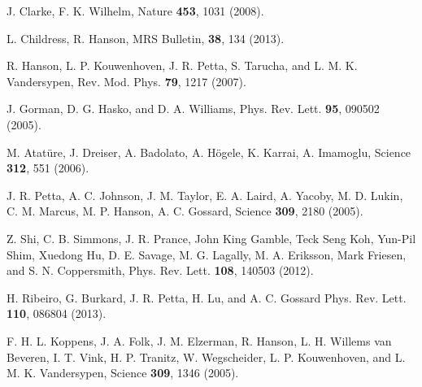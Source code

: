 \documentclass[prb,twocolumn,showpacs,floats]{revtex4}
\begin{document}
\begin{thebibliography}{99}


 J. Clarke, F. K. Wilhelm, Nature {\bf 453}, 1031 (2008).

 L. Childress, R.  Hanson,  MRS Bulletin, {\bf 38}, 134 (2013). 

R. Hanson, L. P.  Kouwenhoven, J. R.  Petta, S. Tarucha,  and L. M. K. Vandersypen,
Rev. Mod. Phys. {\bf 79}, 1217 (2007).

 J. Gorman, D. G. Hasko, and D. A. Williams, Phys. Rev. Lett. {\bf 95}, 090502 (2005).

 M. Atat\"ure, J. Dreiser, A. Badolato, A. H\"ogele, K. Karrai, A. Imamoglu,
Science {\bf 312}, 551 (2006).

 J. R. Petta, A. C. Johnson, J. M. Taylor, E. A. Laird, A. Yacoby, M. D. Lukin, C. M. Marcus, 
M. P. Hanson, A. C. Gossard, Science {\bf 309}, 2180 (2005).

   Z. Shi, C. B. Simmons, J. R. Prance, John King Gamble, Teck Seng Koh, Yun-Pil Shim,
Xuedong Hu, D. E. Savage, M. G. Lagally, M. A. Eriksson, Mark Friesen, and S. N. Coppersmith,
 Phys. Rev. Lett.  {\bf 108}, 140503 (2012).

 H. Ribeiro, G. Burkard, J. R. Petta, H. Lu, and A. C. Gossard
Phys. Rev. Lett. {\bf 110}, 086804 (2013).

 F. H. L. Koppens, J. A. Folk, J. M. Elzerman, R. Hanson, L. H. Willems van Beveren, I. T. Vink, H. P. Tranitz, W. Wegscheider, L. P. Kouwenhoven, and L. M. K. Vandersypen,
Science  {\bf 309}, 1346 (2005).


\end{thebibliography}
\end{document}
